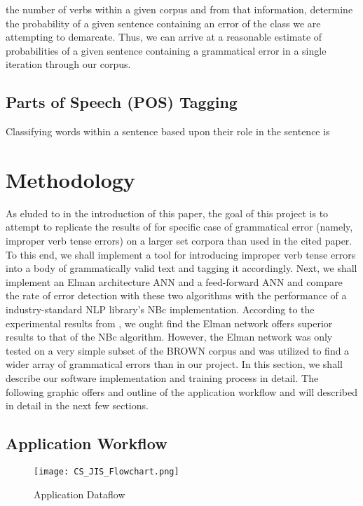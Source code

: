 \documentclass{article}
\begin{document}
the number of verbs within a given corpus and from that information, determine the probability of a given sentence containing an error of the class we are attempting to demarcate. Thus, we can arrive at a reasonable estimate of  probabilities of a given sentence containing a grammatical error in a single iteration through our corpus. 
\subsection{Parts of Speech (POS) Tagging }
Classifying words within a sentence based upon their role in the sentence is
\section{Methodology}
As eluded to in the introduction of this paper, the goal of this project is to attempt to replicate the results of \citep{Smith_grammarinference} for specific case of grammatical error (namely, improper verb tense errors) on a larger set corpora than used in the cited paper. To this end, we shall implement a tool for introducing improper verb tense errors into a body of grammatically valid text and tagging it accordingly. Next, we shall implement an Elman architecture ANN and a feed-forward ANN and compare the rate of error detection with these two algorithms with the performance of a industry-standard NLP library's NBc implementation. According to the experimental results from \citep{Smith_grammarinference}, we ought find the Elman network offers superior results to that of the NBc algorithm. However, the Elman network was only tested on a very simple subset of the BROWN corpus and was utilized to find a wider array of grammatical errors than in our project. In this section, we shall describe our software implementation and training process in detail. The following graphic offers and outline of the application workflow and will described in detail in the next few sections.

\subsection{Application Workflow}
\begin{center}
\begin{figure}[h!]
\centering
\texttt{[image: CS\_JIS\_Flowchart.png]}
\caption{Application Dataflow}
\label{fig:univerise}
\end{figure}
\end{center}
\end{document}
